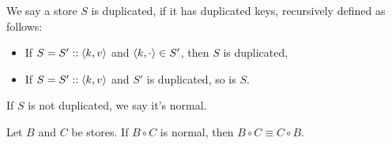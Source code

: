 \begin{definition}[Normality]
We say a store $S$ is duplicated, if it has duplicated keys, recursively defined as follows:
\begin{itemize}
    \item If $S = S' :: \langle k, v \rangle$ and $\left\langle k, \cdot \right\rangle \in S'$, then $S$ is duplicated,
    \item If $S = S' :: \langle k, v \rangle$ and $S'$ is duplicated, so is $S$.
\end{itemize}
If $S$ is not duplicated, we say it's normal.
\end{definition}

\begin{theorem}
Let $B$ and $C$ be stores. If $B \circ C$ is normal, then $B \circ C \equiv C \circ B$.
\end{theorem}